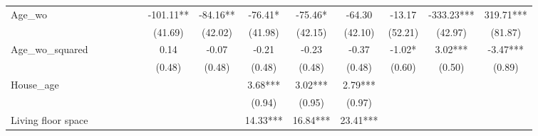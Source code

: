 \begin{subappendices}
{\begin{landscape}
\begin{table}[H]
{\begin{tabular}{lccccccccccccc}
Age_wo                                   &                    &                         &                                  &             &                          & -101.11**         & -84.16**    & -76.41*              & -75.46*                 & -64.30                   & -13.17                & -333.23***                & 319.71***                  \\
                                         &                    &                         &                                  &             &                          & (41.69)           & (42.02)     & (41.98)              & (42.15)                 & (42.10)                  & (52.21)               & (42.97)                   & (81.87)                    \\
Age_wo_squared                           &                    &                         &                                  &             &                          & 0.14              & -0.07       & -0.21                & -0.23                   & -0.37                    & -1.02*                & 3.02***                   & -3.47***                   \\
                                         &                    &                         &                                  &             &                          & (0.48)            & (0.48)      & (0.48)               & (0.48)                  & (0.48)                   & (0.60)                & (0.50)                    & (0.89)                     \\
House_age                                &                    &                         &                                  &             &                          &                   &             & 3.68***              & 3.02***                 & 2.79***                  &                       &                           &                            \\
                                         &                    &                         &                                  &             &                          &                   &             & (0.94)               & (0.95)                  & (0.97)                   &                       &                           &                            \\
Living floor space                       &                    &                         &                                  &             &                          &                   &             & 14.33***             & 16.84***                & 23.41***                 &                       &                           &                            \\

\end{tabular}}
\end{table}
\end{landscape}}
\end{subappendices}
